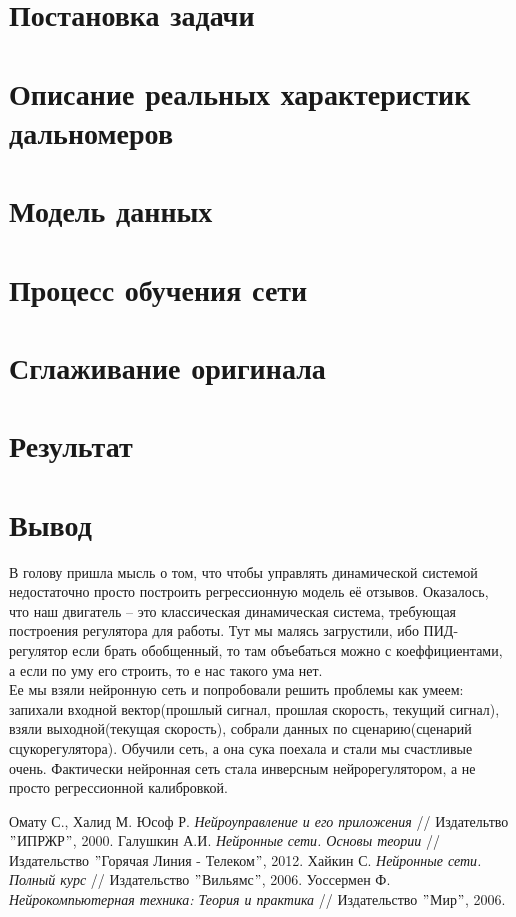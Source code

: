 \documentclass[14pt]{extreport}
\begin{document}
        \section{Постановка задачи}
        \section{Описание реальных характеристик дальномеров}
        \section{Модель данных}
        \section{Процесс обучения сети}
        \section{Сглаживание оригинала}
        \section{Результат}
        \section{Вывод}
            
            
            В голову пришла мысль о том, что чтобы управлять динамической системой недостаточно просто построить регрессионную модель её отзывов. Оказалось, что наш двигатель -- это классическая динамическая система, требующая построения регулятора для работы. Тут мы малясь загрустили, ибо ПИД-регулятор если брать обобщенный, то там объебаться можно с коеффициентами, а если по уму его строить, то е нас такого ума нет.\\
            Ее мы взяли нейронную сеть и попробовали решить проблемы как умеем: запихали входной вектор(прошлый сигнал, прошлая скорость, текущий сигнал), взяли выходной(текущая скорость), собрали данных по сценарию(сценарий сцукорегулятора). Обучили сеть, а она сука поехала и стали мы счастливые очень. Фактически нейронная сеть стала инверсным нейрорегулятором, а не просто регрессионной калибровкой.
\newpage
        \begin{thebibliography}{99}
             Омату С., Халид М. Юсоф Р. {\it Нейроуправление и его приложения} // Издательтво $"$ИПРЖР$"$, 2000.
             Галушкин А.И. {\it Нейронные сети. Основы теории} // Издательство $"$Горячая Линия - Телеком$"$, 2012.
             Хайкин С. {\it Нейронные сети. Полный курс} // Издательство $"$Вильямс$"$, 2006.
             Уоссермен Ф. {\it Нейрокомпьютерная техника: Теория и практика} // Издательство $"$Мир$"$, 2006.
        \end{thebibliography}
\end{document}

